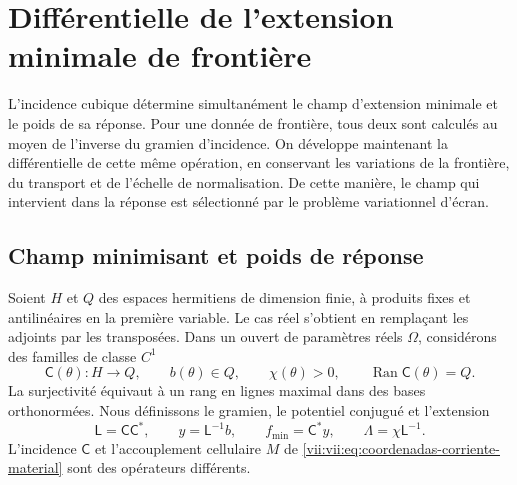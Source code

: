 
\section{Différentielle de l'extension minimale de frontière}
\label{vii:vii:sec:corriente-extension-minima}

L'incidence cubique détermine simultanément le champ d'extension
minimale et le poids de sa réponse. Pour une donnée de frontière, tous deux sont
calculés au moyen de l'inverse du gramien d'incidence. On développe
maintenant la différentielle de cette même opération, en conservant les variations
de la frontière, du transport et de l'échelle de normalisation. De cette
manière, le champ qui intervient dans la réponse est sélectionné par
le problème variationnel d'écran.

\subsection{Champ minimisant et poids de réponse}
\label{vii:vii:subsec:extension-minima-parametrizada}

Soient \(H\) et \(Q\) des espaces hermitiens de dimension finie, à produits fixes et antilinéaires en la première variable. Le cas réel s'obtient en remplaçant les adjoints par les transposées. Dans un ouvert de paramètres réels \(\Omega\), considérons des familles de classe \(C^1\)
\[
 \mathsf C(\theta):H\longrightarrow Q,\qquad
 b(\theta)\in Q,\qquad \chi(\theta)>0,
 \qquad \operatorname{Ran}\mathsf C(\theta)=Q.
\]
La surjectivité équivaut à un rang en lignes maximal dans des bases orthonormées. Nous définissons le gramien, le potentiel conjugué et l'extension
\begin{equation}
 \mathsf L=\mathsf C\mathsf C^*,\qquad
 y=\mathsf L^{-1}b,\qquad f_{\min}=\mathsf C^*y,
 \qquad \Lambda=\chi\mathsf L^{-1}.
 \label{vii:vii:eq:gramiano-extension-minima}
\end{equation}
L'incidence \(\mathsf C\) et l'accouplement cellulaire \(M\) de \eqref{vii:vii:eq:coordenadas-corriente-material} sont des opérateurs différents.

